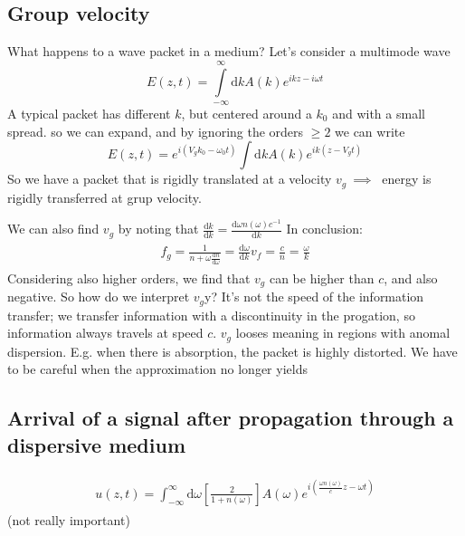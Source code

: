 \documentclass[a4paper, twocolumn]{article}
\begin{document}
\subsection{Group velocity}
\label{sec:group-velocity}
What happens to a wave packet in a medium? Let's consider a multimode wave
\begin{equation}
  \label{eq:56}
  E(z,t)=\int\limits_{-\infty}^{\infty}\mathrm{d}k A(k)e^{ikz-i\omega t}
\end{equation}
A typical packet has different $k$, but centered around a $k_0$ and with a small spread. so we can expand, and by ignoring the orders $\geq2$ we can write
\begin{equation}
  \label{eq:63}
  E(z,t)=e^{i(V_gk_0-\omega_0t)}\int\mathrm{d}k A(k)e^{ik(z-V_gt)}
\end{equation}
So we have a packet that is rigidly translated at a velocity $v_g~\implies~$ energy is rigidly transferred at grup velocity.

We can also find $v_g$ by noting that $\frac{\mathrm{d}k}{\mathrm{d}k}=\frac{\mathrm{d}\omega n(\omega)c^{-1}}{\mathrm{d}k}$
In conclusion:
\begin{align}
  \label{eq:64}
  \begin{split}
    f_g=\frac{1}{n+\omega \frac{\mathrm{d}n}{\mathrm{d}\omega}}=\frac{\mathrm{d}\omega}{\mathrm{d}k}
    v_f=\frac{c}{n}=\frac{\omega}{k}
  \end{split}
\end{align}
Considering also higher orders, we find that $v_g$ can be higher than $c$, and also negative. So how do we interpret $v_g$y? It's not the speed of the information transfer; we transfer information with a discontinuity in the progation, so information always travels at speed $c$. $v_g$ looses meaning in regions with anomal dispersion. E.g. when there is absorption, the packet is highly distorted. We have to be careful when the approximation no longer yields


\subsection{Arrival of a signal after propagation through
a dispersive medium}
\label{sec:arrival-signal-after}
\begin{align}
  \begin{split}
    u(z,t)=\int_{-\infty}^{\infty}\mathrm{d}\omega \left[\frac{2}{1+n(\omega)}\right]A(\omega) e^{i(\frac{\omega n(\omega)}{c}z-\omega t)} 
  \end{split}
\end{align}
(not really important)
\end{document}
